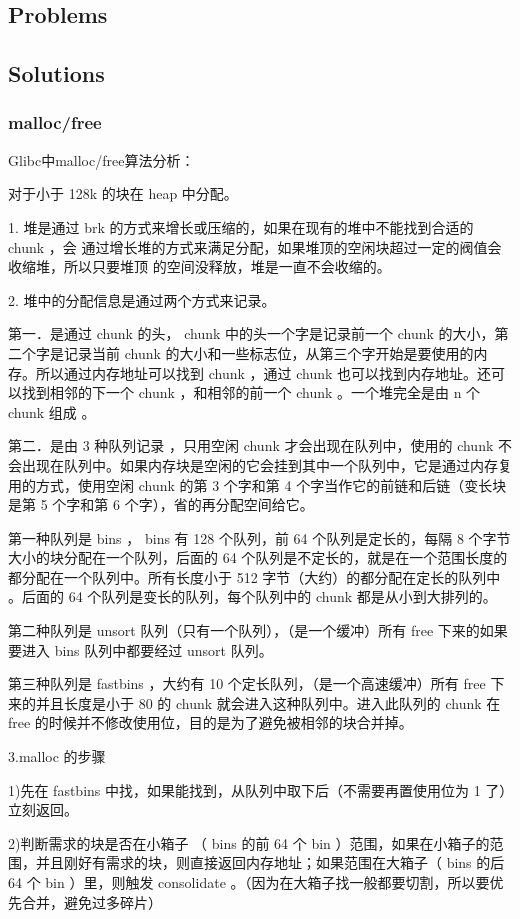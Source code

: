 \documentclass[a4paper, 11pt]{article}
\begin{document}
\subsection{Problems}
\subsection{Solutions}
\subsubsection{malloc/free}
Glibc中malloc/free算法分析：

对于小于 128k 的块在 heap 中分配。

1. 堆是通过 brk 的方式来增长或压缩的，如果在现有的堆中不能找到合适的 chunk ，会
通过增长堆的方式来满足分配，如果堆顶的空闲块超过一定的阀值会收缩堆，所以只要堆顶
的空间没释放，堆是一直不会收缩的。

2. 堆中的分配信息是通过两个方式来记录。

第一．是通过 chunk 的头， chunk 中的头一个字是记录前一个 chunk 的大小，第二个字是记录当前 chunk 的大小和一些标志位，从第三个字开始是要使用的内存。所以通过内存地址可以找到 chunk ，通过 chunk 也可以找到内存地址。还可以找到相邻的下一个 chunk ，和相邻的前一个 chunk 。一个堆完全是由 n 个 chunk 组成 。

第二．是由 3 种队列记录 ，只用空闲 chunk 才会出现在队列中，使用的 chunk 不会出现在队列中。如果内存块是空闲的它会挂到其中一个队列中，它是通过内存复用的方式，使用空闲 chunk 的第 3 个字和第 4 个字当作它的前链和后链（变长块是第 5 个字和第 6 个字），省的再分配空间给它。

第一种队列是 bins ， bins 有 128 个队列，前 64 个队列是定长的，每隔 8 个字节大小的块分配在一个队列，后面的 64 个队列是不定长的，就是在一个范围长度的都分配在一个队列中。所有长度小于 512 字节（大约）的都分配在定长的队列中 。后面的 64 个队列是变长的队列，每个队列中的 chunk 都是从小到大排列的。

第二种队列是 unsort 队列（只有一个队列），（是一个缓冲）所有 free 下来的如果要进入 bins 队列中都要经过 unsort 队列。

第三种队列是 fastbins ，大约有 10 个定长队列，（是一个高速缓冲）所有 free 下来的并且长度是小于 80 的 chunk 就会进入这种队列中。进入此队列的 chunk 在 free 的时候并不修改使用位，目的是为了避免被相邻的块合并掉。

3.malloc 的步骤

1)先在 fastbins 中找，如果能找到，从队列中取下后（不需要再置使用位为 1 了）立刻返回。

2)判断需求的块是否在小箱子 （ bins 的前 64 个 bin ）范围，如果在小箱子的范围，并且刚好有需求的块，则直接返回内存地址；如果范围在大箱子（ bins 的后 64 个 bin ）里，则触发 consolidate 。（因为在大箱子找一般都要切割，所以要优先合并，避免过多碎片）
\end{document}
